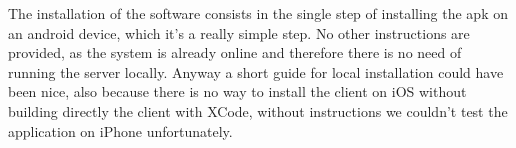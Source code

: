 The installation of the software consists in the single step of installing the apk on an android device, which it's a really simple step. No other instructions are provided, as the system is already online and therefore there is no need of running the server locally. Anyway a short guide for local installation could have been nice, also because there is no way to install the client on iOS without building directly the client with XCode, without instructions we couldn't test the application on iPhone unfortunately.